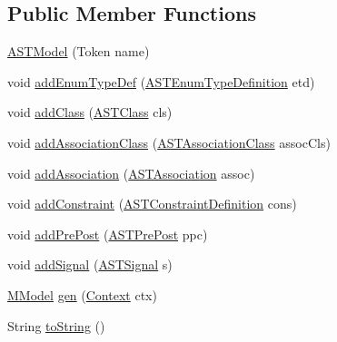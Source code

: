 \subsection*{Public Member Functions}
\begin{DoxyCompactItemize}
\item 
\hyperlink{classorg_1_1tzi_1_1use_1_1parser_1_1use_1_1_a_s_t_model_ac89ea037fce392d565b40e28b754fd01}{A\-S\-T\-Model} (Token name)
\item 
void \hyperlink{classorg_1_1tzi_1_1use_1_1parser_1_1use_1_1_a_s_t_model_af342300199b27bad7f33dfc98b1d355d}{add\-Enum\-Type\-Def} (\hyperlink{classorg_1_1tzi_1_1use_1_1parser_1_1ocl_1_1_a_s_t_enum_type_definition}{A\-S\-T\-Enum\-Type\-Definition} etd)
\item 
void \hyperlink{classorg_1_1tzi_1_1use_1_1parser_1_1use_1_1_a_s_t_model_a3e2aa5b3a9fdcacf36d75cd5e43e2c54}{add\-Class} (\hyperlink{classorg_1_1tzi_1_1use_1_1parser_1_1use_1_1_a_s_t_class}{A\-S\-T\-Class} cls)
\item 
void \hyperlink{classorg_1_1tzi_1_1use_1_1parser_1_1use_1_1_a_s_t_model_a830d6d7b85b2512bd2ddf11cd7a8a439}{add\-Association\-Class} (\hyperlink{classorg_1_1tzi_1_1use_1_1parser_1_1use_1_1_a_s_t_association_class}{A\-S\-T\-Association\-Class} assoc\-Cls)
\item 
void \hyperlink{classorg_1_1tzi_1_1use_1_1parser_1_1use_1_1_a_s_t_model_a0c1cdb8564fc254b356f69912cf68ec4}{add\-Association} (\hyperlink{classorg_1_1tzi_1_1use_1_1parser_1_1use_1_1_a_s_t_association}{A\-S\-T\-Association} assoc)
\item 
void \hyperlink{classorg_1_1tzi_1_1use_1_1parser_1_1use_1_1_a_s_t_model_a3fb6ac787bf07704cf6d2508b2eea925}{add\-Constraint} (\hyperlink{classorg_1_1tzi_1_1use_1_1parser_1_1use_1_1_a_s_t_constraint_definition}{A\-S\-T\-Constraint\-Definition} cons)
\item 
void \hyperlink{classorg_1_1tzi_1_1use_1_1parser_1_1use_1_1_a_s_t_model_a45d1c3abadb71e5bb7d81d2aee789fe7}{add\-Pre\-Post} (\hyperlink{classorg_1_1tzi_1_1use_1_1parser_1_1use_1_1_a_s_t_pre_post}{A\-S\-T\-Pre\-Post} ppc)
\item 
void \hyperlink{classorg_1_1tzi_1_1use_1_1parser_1_1use_1_1_a_s_t_model_aabae9a04726091653d24d7542d8d7d03}{add\-Signal} (\hyperlink{classorg_1_1tzi_1_1use_1_1parser_1_1use_1_1statemachines_1_1_a_s_t_signal}{A\-S\-T\-Signal} s)
\item 
\hyperlink{classorg_1_1tzi_1_1use_1_1uml_1_1mm_1_1_m_model}{M\-Model} \hyperlink{classorg_1_1tzi_1_1use_1_1parser_1_1use_1_1_a_s_t_model_aa242a3bb8cc31389a6e5b7be54b15a68}{gen} (\hyperlink{classorg_1_1tzi_1_1use_1_1parser_1_1_context}{Context} ctx)
\item 
String \hyperlink{classorg_1_1tzi_1_1use_1_1parser_1_1use_1_1_a_s_t_model_ae461e18f15371dc6fae8581397ad700d}{to\-String} ()
\end{DoxyCompactItemize}


